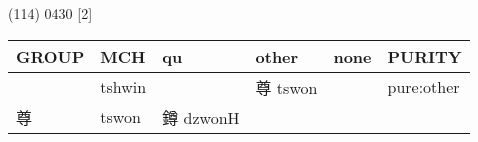\documentclass[14pt,a4paper]{scrartcl}
\begin{document}
(114) 0430 {[}2{]}

\begin{longtable}[c]{@{}llllll@{}}
\toprule
\begin{minipage}[b]{0.14\columnwidth}\raggedright\strut
GROUP
\strut\end{minipage} &
\begin{minipage}[b]{0.14\columnwidth}\raggedright\strut
MCH
\strut\end{minipage} &
\begin{minipage}[b]{0.14\columnwidth}\raggedright\strut
qu
\strut\end{minipage} &
\begin{minipage}[b]{0.14\columnwidth}\raggedright\strut
other
\strut\end{minipage} &
\begin{minipage}[b]{0.14\columnwidth}\raggedright\strut
none
\strut\end{minipage} &
\begin{minipage}[b]{0.14\columnwidth}\raggedright\strut
PURITY
\strut\end{minipage}\tabularnewline
\midrule
\endhead
\begin{minipage}[t]{0.14\columnwidth}\raggedright\strut
𢍜
\strut\end{minipage} &
\begin{minipage}[t]{0.14\columnwidth}\raggedright\strut
tshwin
\strut\end{minipage} &
\begin{minipage}[t]{0.14\columnwidth}\raggedright\strut
\strut\end{minipage} &
\begin{minipage}[t]{0.14\columnwidth}\raggedright\strut
尊 tswon
\strut\end{minipage} &
\begin{minipage}[t]{0.14\columnwidth}\raggedright\strut
\strut\end{minipage} &
\begin{minipage}[t]{0.14\columnwidth}\raggedright\strut
pure:other
\strut\end{minipage}\tabularnewline
\begin{minipage}[t]{0.14\columnwidth}\raggedright\strut
尊
\strut\end{minipage} &
\begin{minipage}[t]{0.14\columnwidth}\raggedright\strut
tswon
\strut\end{minipage} &
\begin{minipage}[t]{0.14\columnwidth}\raggedright\strut
鐏 dzwonH
\strut\end{minipage} &

\end{longtable}
\end{document}

